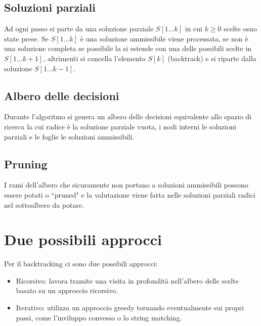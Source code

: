 \subsection{Soluzioni parziali}
Ad ogni passo si parte da una soluzione parziale $S[1\dots k]$ in cui $k\ge 0$ scelte osno state prese. Se $S[1\dots k]$ \`e una soluzione ammissibile viene processata, se non \`e 
una soluzione completa se possibile la si estende con una delle possibili scelte in $S[1\dots k+1]$, altrimenti si cancella l'elemento $S[k]$ (backtrack) e si riparte dalla soluzione
$S[1\dots k-1]$.
\subsection{Albero delle decisioni}
Durante l'algoritmo si genera un albero delle decisioni equivalente allo spazio di ricerca la cui radice \`e la soluzione parziale vuota, i nodi interni le soluzioni parziali e le
foglie le soluzioni ammissibili.
\subsection{Pruning}
I rami dell'albero che sicuramente non portano a soluzioni ammissibili possono essere potati o ``pruned" e la valutazione viene fatta nelle soluzioni parziali radici nel sottoalbero da
potare.
\section{Due possibili approcci}
Per il backtracking ci sono due possibili approcci:
\begin{itemize}
	\item Ricorsivo: lavora tramite una visita in profondit\`a nell'albero delle scelte basato su un approccio ricorsivo.
	\item Iterativo: utilizza un approccio greedy tornando eventualmente sui propri passi, come l'inviluppo convesso o lo string matching.
\end{itemize}
